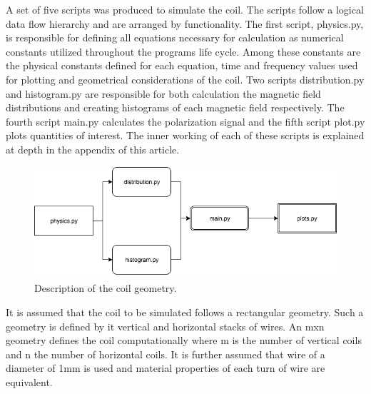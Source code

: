 \documentclass[%
 reprint,
 amsmath,
 amssymb,
 aps,
]{revtex4-1}
\begin{document}
	A set of five scripts was produced to simulate the coil. The scripts follow a logical data flow hierarchy and are arranged by functionality. The first script, physics.py, is responsible for defining all equations necessary for calculation as numerical constants utilized throughout the programs life cycle. Among these constants are the physical constants defined for each equation, time and frequency values used for plotting and geometrical considerations of the coil. Two scripts distribution.py and histogram.py are responsible for both calculation the magnetic field distributions and creating histograms of each magnetic field respectively. The fourth script main.py calculates the polarization signal and the fifth script plot.py plots quantities of interest. The inner working of each of these scripts is explained at depth in the appendix of this article. 
	
	\begin{figure}[H]
 	\includegraphics[width=\linewidth]{programOutline.png}
 	\caption{Description of the coil geometry.}
  	\label{fig:boat1}
	\end{figure}
	
	It is assumed that the coil to be simulated follows a rectangular geometry. Such a geometry is defined by it vertical and horizontal stacks of wires. An mxn geometry defines the coil computationally where m is the number of vertical coils and n the number of horizontal coils. It is further assumed that wire of a diameter of 1mm is used and material properties of each turn of wire are equivalent. 
	
\end{document}
